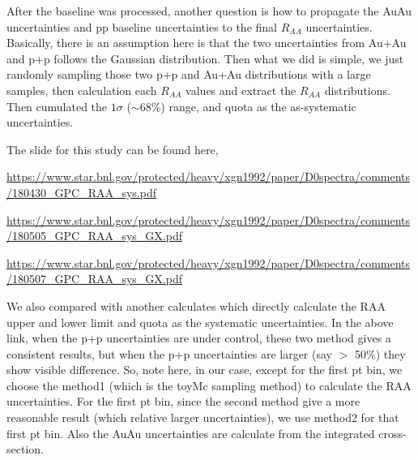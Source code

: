 After the baseline was processed, another question is how to propagate the AuAu uncertainties and pp baseline uncertainties to the final $R_{AA}$ uncertainties. Basically, there is an assumption here is that the two uncertainties from Au+Au and p+p follows the Gaussian distribution. Then what we did is simple, we just randomly sampling those two p+p and Au+Au distributions with a large samples, then calculation each $R_{AA}$ values and extract the $R_{AA}$ distributions. Then cumulated the $1\sigma$ ($\sim68\%$) range, and quota as the as-systematic uncertainties.

The slide for this study can be found here, 

\url{https://www.star.bnl.gov/protected/heavy/xgn1992/paper/D0spectra/comments/180430_GPC_RAA_sys.pdf}

\url{https://www.star.bnl.gov/protected/heavy/xgn1992/paper/D0spectra/comments/180505_GPC_RAA_sys_GX.pdf}

\url{https://www.star.bnl.gov/protected/heavy/xgn1992/paper/D0spectra/comments/180507_GPC_RAA_sys_GX.pdf}

We also compared with another calculates which directly calculate the RAA upper and lower limit and quota as the systematic uncertainties. In the above link, when the p+p uncertainties are under control, these two method gives a consistent results, but when the p+p uncertainties are larger (say $>$ 50\%) they show visible difference. So, note here, in our case, except for the first pt bin, we choose the method1 (which is the toyMc sampling method) to calculate the RAA uncertainties. For the first pt bin, since the second method give a more reasonable result (which relative larger uncertainties), we use method2 for that first pt bin. Also the AuAu uncertainties are calculate from the integrated cross-section.


